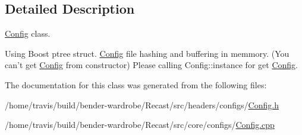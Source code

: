 \subsection{Detailed Description}
\hyperlink{class_config}{Config} class. 

Using Boost ptree struct. \hyperlink{class_config}{Config} file hashing and buffering in memmory. (You can't get \hyperlink{class_config}{Config} from constructor) Please calling Config\-::instance for get \hyperlink{class_config}{Config}. 

The documentation for this class was generated from the following files\-:\begin{DoxyCompactItemize}
\item 
/home/travis/build/bender-\/wardrobe/\-Recast/src/headers/configs/\hyperlink{_config_8h}{Config.\-h}\item 
/home/travis/build/bender-\/wardrobe/\-Recast/src/core/configs/\hyperlink{_config_8cpp}{Config.\-cpp}\end{DoxyCompactItemize}
